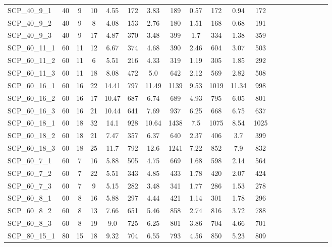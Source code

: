 \begin{sidewaystable}[!ht]
{\begin{tabular}{lccccccccccccccccccc}
SCP\_40\_9\_1 & 40 & 9 & 10 & 4.55 & 172 & 3.83 & 189 &  \textcolor{blue2}{0.57} & 172 & 0.94 & 172 \\
SCP\_40\_9\_2 & 40 & 9 & 8 & 4.08 & 153 & 2.76 & 180 & 1.51 & 168 &  \textcolor{blue2}{0.68} & 191 \\
SCP\_40\_9\_3 & 40 & 9 & 17 & 4.87 & 370 & 3.48 & 399 & 1.7 & 334 &  \textcolor{blue2}{1.38} & 359 \\
SCP\_60\_11\_1 & 60 & 11 & 12 & 6.67 & 374 & 4.68 & 390 &  \textcolor{blue2}{2.46} & 604 & 3.07 & 503 \\
SCP\_60\_11\_2 & 60 & 11 & 6 & 5.51 & 216 & 4.33 & 319 &  \textcolor{blue2}{1.19} & 305 & 1.85 & 292 \\
SCP\_60\_11\_3 & 60 & 11 & 18 & 8.08 & 472 & 5.0 & 642 &  \textcolor{blue2}{2.12} & 569 & 2.82 & 508 \\
SCP\_60\_16\_1 & 60 & 16 & 22 & 14.41 & 797 & 11.49 & 1139 &  \textcolor{blue2}{9.53} & 1019 & 11.34 & 998 \\
SCP\_60\_16\_2 & 60 & 16 & 17 & 10.47 & 687 & 6.74 & 689 &  \textcolor{blue2}{4.93} & 795 & 6.05 & 801 \\
SCP\_60\_16\_3 & 60 & 16 & 21 & 10.44 & 641 & 7.69 & 937 &  \textcolor{blue2}{6.25} & 668 & 6.75 & 637 \\
SCP\_60\_18\_1 & 60 & 18 & 32 & 14.1 & 928 & 10.64 & 1438 &  \textcolor{blue2}{7.5} & 1075 & 8.54 & 1025 \\
SCP\_60\_18\_2 & 60 & 18 & 21 & 7.47 & 357 & 6.37 & 640 &  \textcolor{blue2}{2.37} & 406 & 3.7 & 399 \\
SCP\_60\_18\_3 & 60 & 18 & 25 & 11.7 & 792 & 12.6 & 1241 &  \textcolor{blue2}{7.22} & 852 & 7.9 & 832 \\
SCP\_60\_7\_1 & 60 & 7 & 16 & 5.88 & 505 & 4.75 & 669 &  \textcolor{blue2}{1.68} & 598 & 2.14 & 564 \\
SCP\_60\_7\_2 & 60 & 7 & 22 & 5.51 & 343 & 4.85 & 433 &  \textcolor{blue2}{1.78} & 420 & 2.07 & 424 \\
SCP\_60\_7\_3 & 60 & 7 & 9 & 5.15 & 282 & 3.48 & 341 & 1.77 & 286 &  \textcolor{blue2}{1.53} & 278 \\
SCP\_60\_8\_1 & 60 & 8 & 16 & 5.88 & 297 & 4.44 & 421 &  \textcolor{blue2}{1.14} & 301 & 1.78 & 296 \\
SCP\_60\_8\_2 & 60 & 8 & 13 & 7.66 & 651 & 5.46 & 858 &  \textcolor{blue2}{2.74} & 816 & 3.72 & 788 \\
SCP\_60\_8\_3 & 60 & 8 & 19 & 9.0 & 725 & 6.25 & 801 &  \textcolor{blue2}{3.86} & 704 & 4.66 & 701 \\
SCP\_80\_15\_1 & 80 & 15 & 18 & 9.32 & 704 & 6.55 & 793 &  \textcolor{blue2}{4.56} & 850 & 5.23 & 809 \\

\end{tabular}}
\end{sidewaystable}
